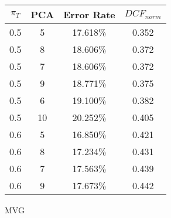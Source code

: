 \begin{tabular}{|c|c|c|c|}
\hline
$\pi_T$ & PCA & Error Rate & $DCF_{norm}$\\
\hline
0.5 & 5 & 17.618\% & 0.352\\
\hline
0.5 & 8 & 18.606\% & 0.372\\
\hline
0.5 & 7 & 18.606\% & 0.372\\
\hline
0.5 & 9 & 18.771\% & 0.375\\
\hline
0.5 & 6 & 19.100\% & 0.382\\
\hline
0.5 & 10 & 20.252\% & 0.405\\
\hline
0.6 & 5 & 16.850\% & 0.421\\
\hline
0.6 & 8 & 17.234\% & 0.431\\
\hline
0.6 & 7 & 17.563\% & 0.439\\
\hline
0.6 & 9 & 17.673\% & 0.442\\
\hline
\end{tabular}
\caption{MVG}\label{tab:mvg_acctable}

